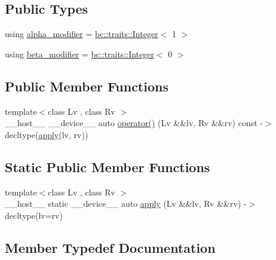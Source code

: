 \subsection*{Public Types}
\begin{DoxyCompactItemize}
\item 
using \hyperlink{structbc_1_1oper_1_1Assign_a7a864b827a77baa288df5e5a6b812b16}{alpha\+\_\+modifier} = \hyperlink{structbc_1_1traits_1_1Integer}{bc\+::traits\+::\+Integer}$<$ 1 $>$
\item 
using \hyperlink{structbc_1_1oper_1_1Assign_ae78c3dadc298a7f88f922cc7d1d2c961}{beta\+\_\+modifier} = \hyperlink{structbc_1_1traits_1_1Integer}{bc\+::traits\+::\+Integer}$<$ 0 $>$
\end{DoxyCompactItemize}
\subsection*{Public Member Functions}
\begin{DoxyCompactItemize}
\item 
{\footnotesize template$<$class Lv , class Rv $>$ }\\\+\_\+\+\_\+host\+\_\+\+\_\+ \+\_\+\+\_\+device\+\_\+\+\_\+ auto \hyperlink{structbc_1_1oper_1_1Assign_a8cb1c55dee85e0040c9c6130656ac2c3}{operator()} (Lv \&\&lv, Rv \&\&rv) const -\/$>$ decltype(\hyperlink{structbc_1_1oper_1_1Assign_a1e478dc4379526354bb93cb91a2cb9a8}{apply}(lv, rv))
\end{DoxyCompactItemize}
\subsection*{Static Public Member Functions}
\begin{DoxyCompactItemize}
\item 
{\footnotesize template$<$class Lv , class Rv $>$ }\\\+\_\+\+\_\+host\+\_\+\+\_\+ static \+\_\+\+\_\+device\+\_\+\+\_\+ auto \hyperlink{structbc_1_1oper_1_1Assign_a1e478dc4379526354bb93cb91a2cb9a8}{apply} (Lv \&\&lv, Rv \&\&rv) -\/$>$ decltype(lv=rv)
\end{DoxyCompactItemize}


\subsection{Member Typedef Documentation}
\mbox{\label{structbc_1_1oper_1_1Assign_a7a864b827a77baa288df5e5a6b812b16}} 
